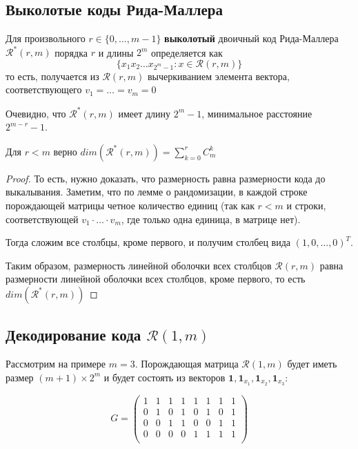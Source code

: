 \subsection{Выколотые коды Рида-Маллера}
\begin{definition}
Для произвольного $r \in \{0, \ldots, m-1\}$ {\bfseries выколотый} двоичный код Рида-Маллера 
$\mathscr{R}^*(r,m)$ порядка $r$ и длины $2^m$ определяется как 
    $$\{x_1 x_2 \ldots x_{2^m-1} \colon x \in \mathscr{R}(r,m)\}$$
то есть, получается из $\mathscr{R}(r,m)$ вычеркиванием элемента вектора, соответствующего $v_1 = \ldots = v_m = 0$
\end{definition}

Очевидно, что $\mathscr{R}^*(r,m)$ имеет длину $2^m-1$, минимальное расстояние $2^{m-r}-1$.

\begin{proposition}
Для $r < m$ верно $dim(\mathscr{R}^*(r,m)) = \sum\limits_{k=0}^r C_m^k$
\end{proposition}
\begin{proof}
То есть, нужно доказать, что размерность равна размерности кода до выкалывания.
Заметим, что по лемме о рандомизации, в каждой строке порождающей матрицы четное 
количество единиц (так как $r<m$ и строки, соответствующей $v_1 \cdot \ldots \cdot v_m$,
где только одна единица, в матрице нет).

Тогда сложим все столбцы, кроме первого, и получим столбец вида $(1,0,\ldots,0)^{T}$.

Таким образом, размерность линейной оболочки всех столбцов $\mathscr{R}(r,m)$ равна размерности
линейной оболочки всех столбцов, кроме первого, то есть $dim(\mathscr{R}^*(r,m))$
\end{proof}

\subsection{Декодирование кода $\mathscr{R}(1,m)$}

Рассмотрим на примере $m=3$. Порождающая матрица $\mathscr{R}(1,m)$ будет иметь размер $(m+1) \times 2^m$
и будет состоять из векторов $\mathbf{1}, \mathbf{1}_{x_1}, \mathbf{1}_{x_2}, \mathbf{1}_{x_3}$:

$$G = \begin{pmatrix}1 & 1 & 1 & 1 & 1 & 1 & 1 & 1  \\
0 & 1 & 0 & 1 & 0 & 1 & 0 & 1  \\
0 & 0 & 1 & 1 & 0 & 0 & 1 & 1  \\
0 & 0 & 0 & 0 & 1 & 1 & 1 & 1  \\
\end{pmatrix}$$

